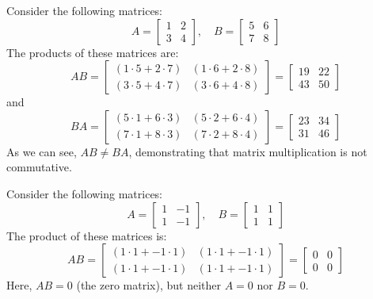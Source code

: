 \begin{eg}
    Consider the following matrices:
    \[
        A = 
        \begin{bmatrix}
            1 & 2 \\
            3 & 4
        \end{bmatrix}
        , \quad
        B = 
        \begin{bmatrix}
            5 & 6 \\
            7 & 8
        \end{bmatrix}
    \]
    The products of these matrices are:
    \[
        AB = 
        \begin{bmatrix}
            (1 \cdot 5 + 2 \cdot 7) & (1 \cdot 6 + 2 \cdot 8) \\
            (3 \cdot 5 + 4 \cdot 7) & (3 \cdot 6 + 4 \cdot 8)
        \end{bmatrix}
        =
        \begin{bmatrix}
            19 & 22 \\
            43 & 50
        \end{bmatrix}
    \]
    and
    \[
        BA = 
        \begin{bmatrix}
            (5 \cdot 1 + 6 \cdot 3) & (5 \cdot 2 + 6 \cdot 4) \\
            (7 \cdot 1 + 8 \cdot 3) & (7 \cdot 2 + 8 \cdot 4)
        \end{bmatrix}
        =
        \begin{bmatrix}
            23 & 34 \\
            31 & 46
        \end{bmatrix}
    \]
    As we can see, \( AB \neq BA \), demonstrating that matrix multiplication is not commutative.
\end{eg}
\begin{eg}
    Consider the following matrices:
    \[
        A = 
        \begin{bmatrix}
            1 & -1 \\
            1 & -1
        \end{bmatrix}
        , \quad
        B = 
        \begin{bmatrix}
            1 & 1 \\
            1 & 1
        \end{bmatrix}
    \]
    The product of these matrices is:
    \[
        AB = 
        \begin{bmatrix}
            (1 \cdot 1 + -1 \cdot 1) & (1 \cdot 1 + -1 \cdot 1) \\
            (1 \cdot 1 + -1 \cdot 1) & (1 \cdot 1 + -1 \cdot 1)
        \end{bmatrix}
        =
        \begin{bmatrix}
            0 & 0 \\
            0 & 0
        \end{bmatrix}
    \]
    Here, \( AB = 0 \) (the zero matrix), but neither \( A = 0 \) nor \( B = 0 \).
\end{eg}

